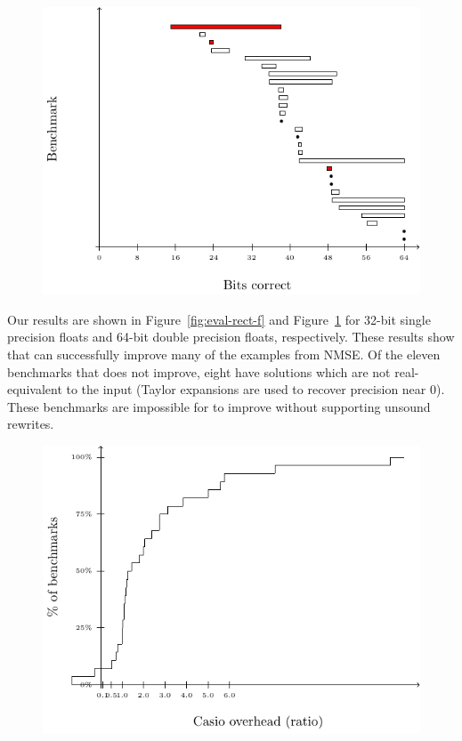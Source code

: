 \documentclass[paper.tex]{subfiles}
\begin{document}
\begin{figure}
\label{fig:eval-rect-d}
\includegraphics[width=0.9\columnwidth]{fig/eval-rect-d.pdf}
\caption{}
\end{figure}

 Our results are shown in Figure~\ref{fig:eval-rect-f}
and Figure~\ref{fig:eval-rect-d} for 32-bit single precision floats
and 64-bit double precision floats, respectively.  These results show
that \casio can successfully improve many of the examples from NMSE.
Of the eleven benchmarks that \casio does not improve, eight have
solutions which are not real-equivalent to the input (Taylor
expansions are used to recover precision near 0).  These benchmarks
are impossible for \casio to improve without supporting unsound
rewrites.

\begin{figure}
\label{fig:eval-overhead-f}
\includegraphics[width=0.9\columnwidth]{fig/eval-overhead-f.pdf}
\caption{}
\end{figure}
\end{document}
